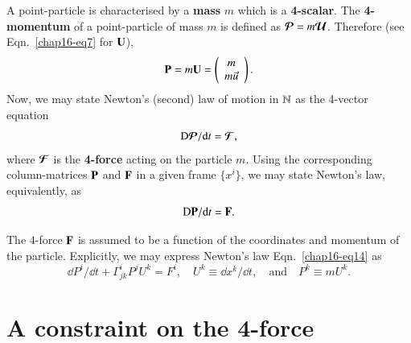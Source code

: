 A point-particle is characterised by a \textbf{mass} $m$ which is a \textbf{4-scalar}.  The \textbf{4-momentum} of a point-particle of mass  $m$ is defined  as $\bm{\mathcal{P}}=m\bm{\mathcal{U}}$. Therefore (see Eqn.~\eqref{chap16-eq7} for ${\mathbf{U}}$),
\setcounter{equation}{11}
\begin{equation}
{\mathbf{P}}=m{\mathbf{U}}=\left(\begin{array}{c}m \\ m\vec{u}\end{array}\right).\label{chap16-eq12}
\end{equation}
Now, we may state Newton's (second) law of motion in $\mathbb{N}$ as the 4-vector equation 
\begin{equation}
{{\mathrm{D}}}\bm{\mathcal{P}}/\mathrm{d} t=\bm{\mathcal{F}},\label{chap16-eq13}
\end{equation}
where $\bm{\mathcal{F}}$ is the \textbf{4-force} acting on the particle $m$. Using the  corresponding column-matrices $\mathbf{P}$ and $\mathbf{F}$ in a given frame $\{x^i\}$, we may state Newton's law,  equivalently, as
\begin{equation}
{\mathrm{D}}{\mathbf{P}}/\mathrm{d} t={\mathbf{F}}.\label{chap16-eq14}
\end{equation}

The 4-force $\mathbf{F}$ is assumed to be a function of the coordinates and momentum of the particle. Explicitly, we may express  Newton's law Eqn.~\eqref{chap16-eq14}  as 
\begin{equation}
\dd P^i /\dd t + \Gamma^i_{jk}P^j U^k=F^i, \quad  U^k \equiv \dd x^k/\dd  t, \quad \text{and} \quad P^k \equiv m U^k.\label{chap16-eq15}
\end{equation}

\section{A  constraint on the 4-force}\label{chap16-sec5}

